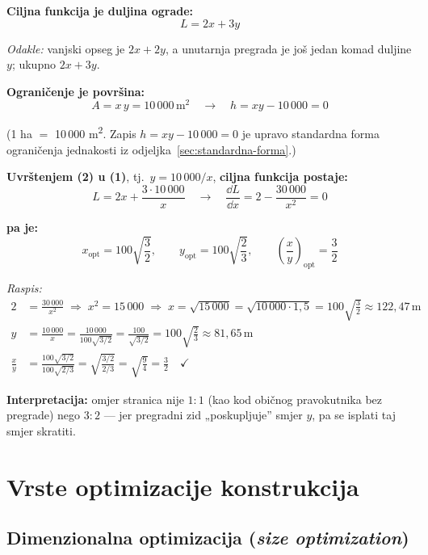 \textbf{Ciljna funkcija je duljina ograde:}
\begin{equation}
L = 2x + 3y
\end{equation}

\emph{Odakle:} vanjski opseg je $2x + 2y$, a unutarnja pregrada je još jedan
komad duljine $y$; ukupno $2x + 3y$.

\textbf{Ograničenje je površina:}
\begin{equation}
A = x\,y = 10\,000\,\text{m}^2 \quad \to \quad h = xy - 10\,000 = 0
\end{equation}

(1 ha $=$ 10\,000 m\textsuperscript{2}. Zapis $h = xy - 10\,000 = 0$ je upravo
standardna forma ograničenja jednakosti iz
odjeljka~\ref{sec:standardna-forma}.)

\textbf{Uvrštenjem (2) u (1)}, tj.\ $y = 10\,000/x$, \textbf{ciljna funkcija
postaje:}
\[
L = 2x + \frac{3 \cdot 10\,000}{x}
\quad \to \quad
\frac{\dd L}{\dd x} = 2 - \frac{30\,000}{x^2} = 0
\]

\textbf{pa je:}
\[
x_{\text{opt}} = 100\sqrt{\frac{3}{2}}, \qquad
y_{\text{opt}} = 100\sqrt{\frac{2}{3}}, \qquad
\left(\frac{x}{y}\right)_{\text{opt}} = \frac{3}{2}
\]

\emph{Raspis:}
\begin{align}
2 &= \frac{30\,000}{x^2} \;\Rightarrow\; x^2 = 15\,000
\;\Rightarrow\; x = \sqrt{15\,000} = \sqrt{10\,000 \cdot 1{,}5}
= 100\sqrt{\tfrac{3}{2}} \approx 122{,}47\,\text{m} \\
y &= \frac{10\,000}{x} = \frac{10\,000}{100\sqrt{3/2}} = \frac{100}{\sqrt{3/2}}
= 100\sqrt{\tfrac{2}{3}} \approx 81{,}65\,\text{m} \\
\frac{x}{y} &= \frac{100\sqrt{3/2}}{100\sqrt{2/3}} = \sqrt{\frac{3/2}{2/3}}
= \sqrt{\frac{9}{4}} = \frac{3}{2} \quad \checkmark
\end{align}

\textbf{Interpretacija:} omjer stranica nije $1{:}1$ (kao kod običnog
pravokutnika bez pregrade) nego $3{:}2$ --- jer pregradni zid „poskupljuje”
smjer $y$, pa se isplati taj smjer skratiti.

\section{Vrste optimizacije konstrukcija}

\subsection{Dimenzionalna optimizacija (\emph{size optimization})}

